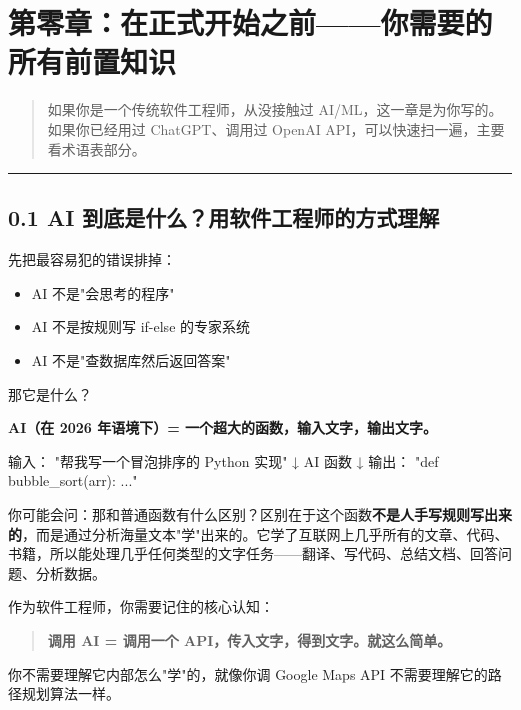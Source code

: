 \chapter*{第零章：在正式开始之前------你需要的所有前置知识}

\begin{quote}
如果你是一个传统软件工程师，从没接触过 AI/ML，这一章是为你写的。\\
如果你已经用过 ChatGPT、调用过 OpenAI API，可以快速扫一遍，主要看术语表部分。\\
\end{quote}

\bigskip\hrule\bigskip

\section{0.1 AI 到底是什么？用软件工程师的方式理解}

先把最容易犯的错误排掉：


\begin{itemize}[leftmargin=2em]
\item [X] AI 不是"会思考的程序"
\item [X] AI 不是按规则写 if-else 的专家系统
\item [X] AI 不是"查数据库然后返回答案"
\end{itemize}

那它是什么？


\textbf{AI（在 2026 年语境下）= 一个超大的函数，输入文字，输出文字。}


\begin{codeblock}
输入：  "帮我写一个冒泡排序的 Python 实现"
  ↓
AI 函数
  ↓
输出：  "def bubble_sort(arr): ..."
\end{codeblock}

你可能会问：那和普通函数有什么区别？区别在于这个函数\textbf{不是人手写规则写出来的}，而是通过分析海量文本"学"出来的。它学了互联网上几乎所有的文章、代码、书籍，所以能处理几乎任何类型的文字任务------翻译、写代码、总结文档、回答问题、分析数据。


作为软件工程师，你需要记住的核心认知：


\begin{quote}
\textbf{调用 AI = 调用一个 API，传入文字，得到文字。就这么简单。}\\
\end{quote}

你不需要理解它内部怎么"学"的，就像你调 Google Maps API 不需要理解它的路径规划算法一样。


